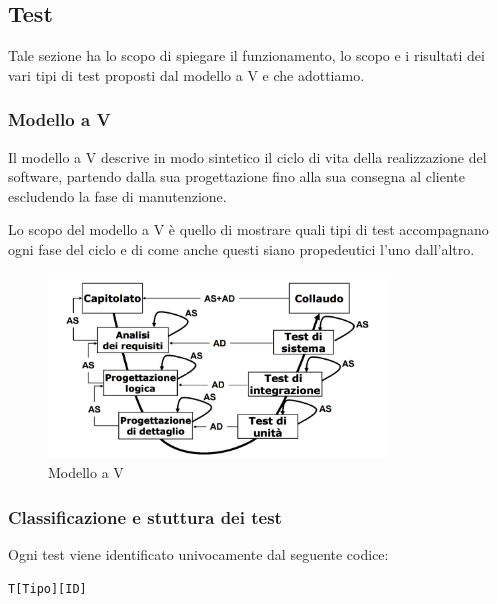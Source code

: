 \subsection{Test} \label{test}

Tale sezione ha lo scopo di spiegare il funzionamento, lo scopo e i risultati dei vari tipi di test proposti dal modello a V e che adottiamo.

\subsubsection{Modello a V} \label{sezionemodelloV}
Il modello a V descrive in modo sintetico il ciclo di vita della realizzazione del software, partendo dalla sua progettazione fino alla sua consegna al cliente escludendo la fase di manutenzione.

Lo scopo del modello a V è quello di mostrare quali tipi di test accompagnano ogni fase del ciclo e di come anche questi siano propedeutici l'uno dall'altro.

\begin{figure}[H]
	\centering
	\includegraphics[width=0.8\textwidth]{img/modellov-sweki_inv.png}
	\caption[Modello a V]{Modello a V\protect\footnotemark}
	\label{img:vmodel}
\end{figure}


\subsubsection{Classificazione e stuttura dei test} \label{classificazionetest}
Ogni test viene identificato univocamente dal seguente codice:

\begin{center}
	\texttt{T[Tipo][ID]}
\end{center}

